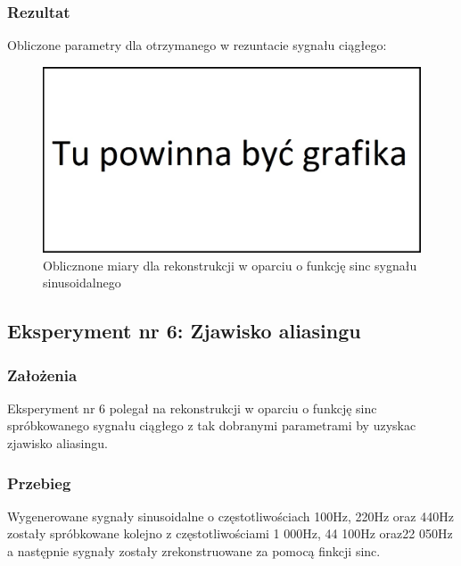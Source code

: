 \documentclass[12pt]{article}
\begin{document}
\subsubsection{Rezultat}
Obliczone parametry dla otrzymanego w rezuntacie sygnału ciągłego:
\begin{figure}[H]
	\centering
	\includegraphics[width=\linewidth]{tmp.jpg}
	\caption{Oblicznone miary dla rekonstrukcji w oparciu o funkcję sinc sygnału sinusoidalnego}
	\label{wartości dla eksperymentu 5}
\end{figure}

\newpage
\subsection{Eksperyment nr 6: Zjawisko aliasingu }
\subsubsection{Założenia}
Eksperyment nr 6 polegał na rekonstrukcji w oparciu o funkcję sinc spróbkowanego sygnału ciągłego z tak dobranymi parametrami by uzyskac zjawisko aliasingu.
\subsubsection{Przebieg}
Wygenerowane sygnały sinusoidalne o częstotliwościach 100Hz, 220Hz oraz 440Hz  zostały spróbkowane kolejno z częstotliwościami  1 000Hz, 44 100Hz oraz22 050Hz a następnie sygnały zostały zrekonstruowane za pomocą finkcji sinc.
\end{document}
